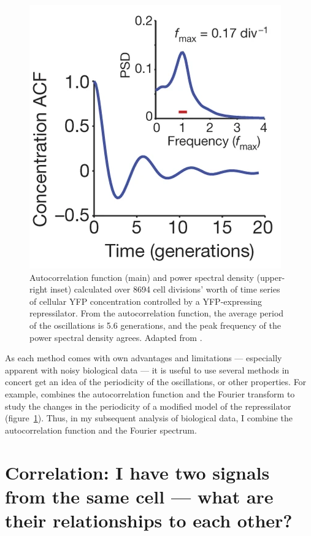 \begin{figure}
  \centering
  \includegraphics[width=0.5\linewidth]{potvin-trottierSynchronousLongtermOscillations2016_1e_adapted}
  \caption{
    Autocorrelation function (main) and power spectral density (upper-right inset) calculated over \num{8694} cell divisions' worth of time series of cellular YFP concentration controlled by a YFP-expressing repressilator.
    From the autocorrelation function, the average period of the oscillations is 5.6 generations, and the peak frequency of the power spectral density agrees.
    Adapted from \textcite{potvin-trottierSynchronousLongtermOscillations2016}.
  }
  \label{fig:acf-fft-example}
\end{figure}

As each method comes with own advantages and limitations --- especially apparent with noisy biological data --- it is useful to use several methods in concert get an idea of the periodicity of the oscillations, or other properties.
For example, \textcite{potvin-trottierSynchronousLongtermOscillations2016} combines the autocorrelation function and the Fourier transform to study the changes in the periodicity of a modified model of the repressilator (figure~\ref{fig:acf-fft-example}).
Thus, in my subsequent analysis of biological data, I combine the autocorrelation function and the Fourier spectrum.



\section[Correlation]{Correlation: I have two signals from the same cell --- what are their relationships to each other?}
\label{sec:analysis-correlation}

